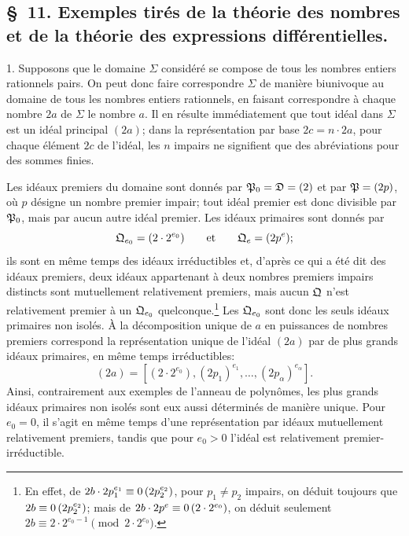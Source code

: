 
\setcounter{footnote}{46}
\subsection*{\S~11. Exemples tirés de la théorie des nombres et de la théorie des expressions différentielles.}

1. Supposons que le domaine $\Sigma$ considéré se compose de tous les nombres entiers rationnels pairs. On peut donc faire correspondre $\Sigma$ de manière biunivoque au domaine de tous les nombres entiers rationnels, en faisant correspondre à chaque nombre $2a$ de $\Sigma$ le nombre $a$. Il en résulte immédiatement que tout idéal dans $\Sigma$ est un idéal principal $(2a)$; dans la représentation par base $2c=n\cdot2a$, pour chaque élément $2c$ de l'idéal, les $n$ impairs ne signifient que des abréviations pour des sommes finies.

Les idéaux premiers du domaine sont donnés par $\mathfrak{P}_0=\mathfrak{D}=(2)$ et par $\mathfrak{P}=(2p)$, où $p$ désigne un nombre premier impair; tout idéal premier est donc divisible par $\mathfrak{P}_0$, mais par aucun autre idéal premier. Les idéaux primaires sont donnés par
\[
 \mathfrak{Q}_{e_0}=(2\cdot2^{e_0})
 \qquad\text{et}\qquad
 \mathfrak{Q}_e=(2p^e);
\]
ils sont en même temps des idéaux irréductibles et, d'après ce qui a été dit des idéaux premiers, deux idéaux appartenant à deux nombres premiers impairs distincts sont mutuellement relativement premiers, mais aucun $\mathfrak{Q}$ n'est relativement premier à un $\mathfrak{Q}_{e_0}$ quelconque.\footnote{En effet, de $2b\cdot2p_1^{e_1}\equiv 0\,(2p_2^{e_2})$, pour $p_1\ne p_2$ impairs, on déduit toujours que $2b\equiv 0\,(2p_2^{e_2})$; mais de $2b\cdot2p^e\equiv 0\,(2\cdot2^{e_0})$, on déduit seulement $2b\equiv2\cdot2^{e_0-1}\pmod{2\cdot2^{e_0}}$.} Les $\mathfrak{Q}_{e_0}$ sont donc les seuls idéaux primaires non isolés. À la décomposition unique de $a$ en puissances de nombres premiers correspond la représentation unique de l'idéal $(2a)$ par de plus grands idéaux primaires, en même temps irréductibles:
\[
 (2a)=[(2\cdot2^{e_0}),(2p_1)^{e_1},
\ldots,(2p_\alpha)^{e_\alpha}].
\]
Ainsi, contrairement aux exemples de l'anneau de polynômes, les plus grands idéaux primaires non isolés sont eux aussi déterminés de manière unique. Pour $e_0=0$, il s'agit en même temps d'une représentation par idéaux mutuellement relativement premiers, tandis que pour $e_0>0$ l'idéal est relativement premier-irréductible.

